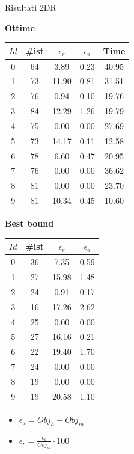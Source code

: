\documentclass{beamer}
\begin{document}
\begin{frame}{Risultati 2DR}
	\begin{minipage}{0.49\textwidth}
		\centering
		\textbf{Ottime}

		\vspace{.5em}
		\begin{tabular}{c|c|c|c|c}
			$Id$ & \#ist & $\epsilon_r$ & $\epsilon_a$ & Time  \\
			\hline
			0  & 64  & 3.89         & 0.23         & 40.95 \\
			1  & 73  & 11.90        & 0.81         & 31.51 \\
			2  & 76  & 0.94         & 0.10         & 19.76 \\
			3  & 84  & 12.29        & 1.26         & 19.79 \\
			4  & 75  & 0.00         & 0.00         & 27.69 \\
			5  & 73  & 14.17        & 0.11         & 12.58 \\
			6  & 78  & 6.60         & 0.47         & 20.95 \\
			7  & 76  & 0.00         & 0.00         & 36.62 \\
			8  & 81  & 0.00         & 0.00         & 23.70 \\
			9  & 81  & 10.34        & 0.45         & 10.60 \\
		\end{tabular}
	\end{minipage}
	\begin{minipage}{0.49\textwidth}
		\centering
		\textbf{Best bound}

		\vspace{.5em}
		\begin{tabular}{c|c|c|c}
			$Id$ & \#ist & $\epsilon_r$ & $\epsilon_a$ \\
			\hline
			0  & 36  & 7.35         & 0.59         \\
			1  & 27  & 15.98        & 1.48         \\
			2  & 24  & 0.91         & 0.17         \\
			3  & 16  & 17.26        & 2.62         \\
			4  & 25  & 0.00         & 0.00         \\
			5  & 27  & 16.16        & 0.21         \\
			6  & 22  & 19.40        & 1.70         \\
			7  & 24  & 0.00         & 0.00         \\
			8  & 19  & 0.00         & 0.00         \\
			9  & 19  & 20.58        & 1.10         \\
		\end{tabular}
	\end{minipage}
	\vspace{.5em}
	\begin{itemize}
		\item $\epsilon_a = Obj_h - Obj_m$
		\item $\epsilon_r = \frac{\epsilon_a}{Obj_m} \cdot 100$
	\end{itemize}	
	\end{frame}
\end{document}
